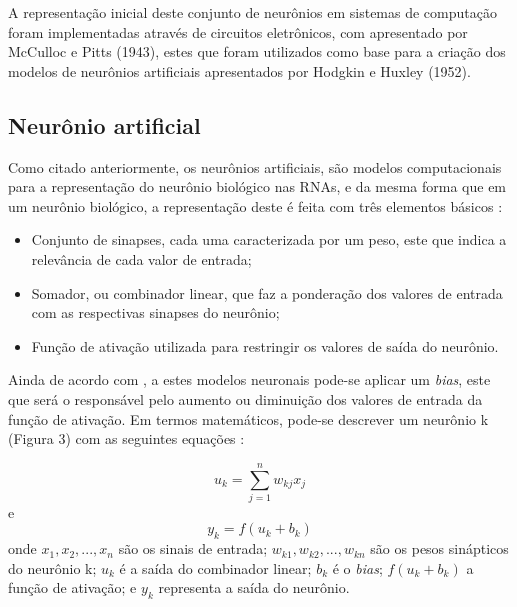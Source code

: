 

A representação inicial deste conjunto de neurônios em sistemas de computação foram implementadas através de circuitos eletrônicos, com apresentado por McCulloc e Pitts (1943), estes que foram utilizados como base para a criação dos modelos de neurônios artificiais apresentados por Hodgkin e Huxley (1952).

\subsection{Neurônio artificial}

Como citado anteriormente, os neurônios artificiais, são modelos computacionais para a representação do neurônio biológico nas RNAs, e da mesma forma que em um neurônio biológico, a representação deste é feita com três elementos básicos \cite{Haykin2001}:  

\begin{itemize}
	\item Conjunto de sinapses, cada uma caracterizada por um peso, este que indica a relevância de cada valor de entrada;
	\item Somador, ou combinador linear, que faz a ponderação dos valores de entrada com as respectivas sinapses do neurônio;
	\item Função de ativação utilizada para restringir os valores de saída do neurônio.
\end{itemize}

Ainda de acordo com , a estes modelos neuronais pode-se aplicar um \textit{bias}, este que será o responsável pelo aumento ou diminuição dos valores de entrada da função de ativação. Em termos matemáticos, pode-se descrever um neurônio k (Figura 3) com as seguintes equações \cite{Haykin2001}:

\begin{equation}
	u_{k} = \sum_{j=1}^{n} w_{kj} x_{j}
\end{equation}
e
\begin{equation}
	y_{k} = f(u_{k} + b_{k})	
\end{equation}
onde $ x_{1}, x_{2}, ..., x_{n} $ são os sinais de entrada; $ w_{k1}, w_{k2}, ..., w_{kn} $ são os pesos sinápticos do neurônio k; $ u_{k} $ é a saída do combinador linear; $ b_{k} $ é o \textit{bias}; $ f(u_{k} + b_{k}) $ a função de ativação; e $ y_{k} $ representa a saída do neurônio.

